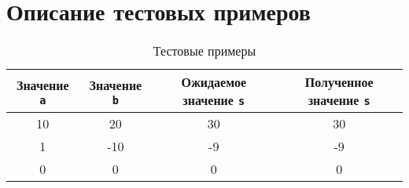 \section{Описание тестовых примеров}

\begin{table}[H]
  \centering
  \begin{tabular}{|| c | c | c | c ||}
    \hline
    Значение \texttt{a} & Значение \texttt{b} & Ожидаемое значение \texttt{s} & Полученное значение \texttt{s} \\
    \hline\hline
    10 & 20 & 30 & 30 \\
    \hline
    1 & -10 & -9 & -9 \\
    \hline
    0 & 0 & 0 & 0 \\
    \hline
  \end{tabular}
  \caption{Тестовые примеры}
\end{table}

